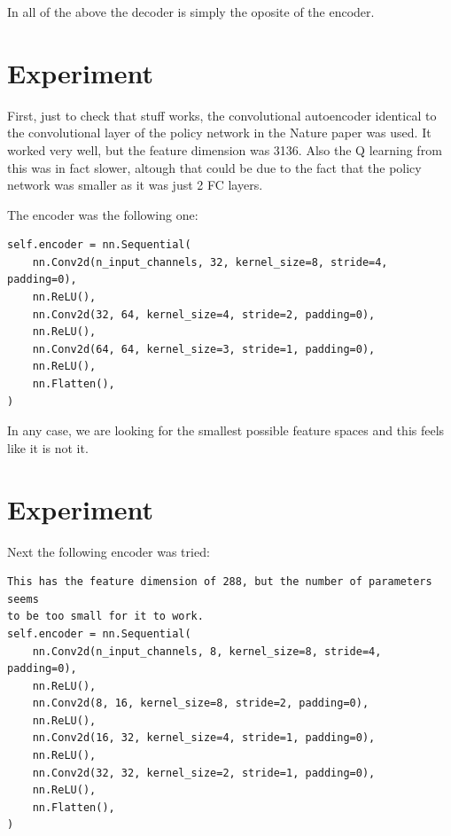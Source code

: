 \documentclass{article}
\begin{document}
In all of the above the decoder is simply the oposite of the encoder.
\section{Experiment}
First, just to check that stuff works, the convolutional autoencoder identical to
the convolutional layer of the policy network in the Nature paper was used.
It worked very well, but the feature dimension was 3136.
Also the Q learning from this was in fact slower,
altough that could be due to the fact that the policy network was smaller
as it was just 2 FC layers.

The encoder was the following one:
\begin{verbatim}
self.encoder = nn.Sequential(
    nn.Conv2d(n_input_channels, 32, kernel_size=8, stride=4, padding=0),
    nn.ReLU(),
    nn.Conv2d(32, 64, kernel_size=4, stride=2, padding=0),
    nn.ReLU(),
    nn.Conv2d(64, 64, kernel_size=3, stride=1, padding=0),
    nn.ReLU(),
    nn.Flatten(),
)

\end{verbatim}

In any case, we are looking for the smallest possible feature spaces
and this feels like it is not it.

\section{Experiment}
Next the following encoder was tried:

\begin{verbatim}
This has the feature dimension of 288, but the number of parameters seems
to be too small for it to work.
self.encoder = nn.Sequential(
    nn.Conv2d(n_input_channels, 8, kernel_size=8, stride=4, padding=0),
    nn.ReLU(),
    nn.Conv2d(8, 16, kernel_size=8, stride=2, padding=0),
    nn.ReLU(),
    nn.Conv2d(16, 32, kernel_size=4, stride=1, padding=0),
    nn.ReLU(),
    nn.Conv2d(32, 32, kernel_size=2, stride=1, padding=0),
    nn.ReLU(),
    nn.Flatten(),
)
\end{verbatim}
\end{document}
